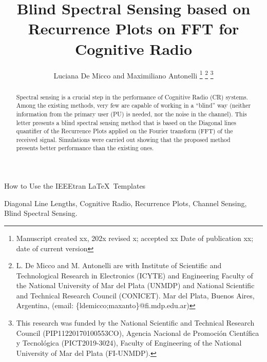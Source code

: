 \documentclass[lettersize,journal]{IEEEtran}
\begin{document}
\title{Blind Spectral Sensing based on Recurrence Plots on FFT for Cognitive Radio}
\author{Luciana De Micco and Maximiliano Antonelli 
\thanks{Manuscript created xx, 202x revised x; accepted xx Date of publication xx; date of current version}
\thanks{L. De Micco and M. Antonelli are with Institute of Scientific and Technological Research in Electronics (ICYTE) and  Engineering Faculty of the National University of Mar del Plata (UNMDP) and National Scientific and Technical Research Council (CONICET). Mar del Plata, Buenos Aires, Argentina, (email: \{ldemicco;maxanto\}@fi.mdp.edu.ar)}
\thanks{This research was funded by the National Scientific and Technical Research Council (PIP11220170100553CO), Agencia Nacional de Promoción Científica y Tecnológica (PICT2019-3024), Faculty of Engineering of the National University of Mar del Plata (FI-UNMDP).}}

%
{How to Use the IEEEtran \LaTeX \ Templates}

\maketitle

\begin{abstract}

Spectral sensing is a crucial step in the performance of Cognitive Radio (CR) systems. Among the existing methods, very few are capable of working in a ``blind'' way (neither information from the primary user (PU) is needed, nor the noise in the channel). This letter presents a blind spectral sensing method that is based on the Diagonal lines quantifier of the Recurrence Plots applied on the Fourier transform (FFT) of the received signal. Simulations were carried out showing that the proposed method presents better performance than the existing ones. 
\end{abstract}

\begin{IEEEkeywords}
Diagonal Line Lengths, Cognitive Radio, Recurrence Plots, Channel Sensing, Blind Spectral Sensing.
\end{IEEEkeywords}
\end{document}
